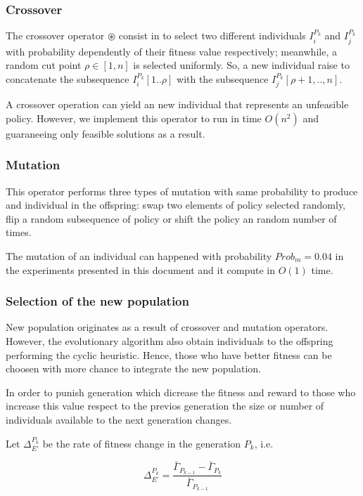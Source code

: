 \subsubsection*{Crossover}

The crossover operator $\circledast$ consist in to select two different individuals $I^{P_k}_i$ and $I^{P_k}_j$ with probability dependently of their fitness value respectively; meanwhile, a random cut point $\rho \in [1,n]$ is selected uniformly. So, a new individual raise to concatenate the subsequence $I^{P_k}_i[1..\rho]$ with the subsequence $I^{P_k}_j[\rho+1,..,n]$. 

A crossover operation can yield an new individual that represents an unfeasible policy. However, we implement this operator to run in time $O(n^2)$ and guaraneeing only feasible solutions as a result.


\subsubsection*{Mutation}

This operator performs three types of mutation with same probability to produce and individual in the offspring: swap two elements of policy selected randomly, flip a random subsequence of policy or shift the policy an random number of times.

The mutation of an individual can happened with probability $Prob_m = 0.04$ in the experiments presented in this document and it compute in $O(1)$ time.


\subsubsection*{Selection of the new population}

New population originates as a result of crossover and mutation operators. However, the evolutionary algorithm also obtain individuals to the offspring performing the cyclic heuristic. Hence, those who have better fitness can be choosen with more chance to integrate the new population.

In order to punish generation which dicrease the fitness and reward to those who increase this value respect to the previos generation the size or number of individuals available to the next generation changes.

Let $\Delta^{P_k}_{E'}$ be the rate of fitness change in the generation $P_k$, i.e.

\begin{equation}\label{eq:improve_fitness}
 \Delta^{P_k}_{E'} = \frac{\bar{\Gamma}_{P_{k-1}} - \bar{\Gamma}_{P_k}}{\bar{\Gamma}_{P_{k-1}}} 
\end{equation}

